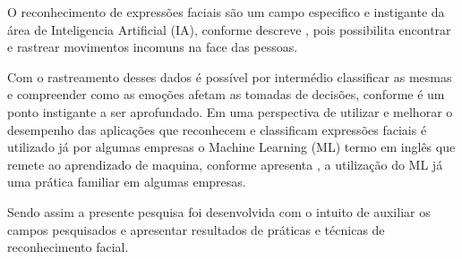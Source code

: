 O reconhecimento de expressões faciais são um campo especifico e instigante da área de Inteligencia Artificial (IA), conforme descreve \cite{murtaza:2019}, pois possibilita encontrar e rastrear movimentos incomuns na face das pessoas.

Com o rastreamento desses dados é possível por intermédio classificar as mesmas e compreender como as emoções afetam as tomadas de decisões, conforme \cite{hieida:2018} é um ponto instigante a ser aprofundado.
Em uma perspectiva de utilizar e melhorar o desempenho das aplicações que reconhecem e classificam expressões faciais é utilizado já por algumas empresas o Machine Learning (ML) termo em inglês que remete ao aprendizado de maquina, conforme apresenta \cite{ray:2019}, a utilização do ML já uma prática familiar em algumas empresas.

Sendo assim a presente pesquisa foi desenvolvida com o intuito de auxiliar os campos pesquisados e apresentar resultados de práticas e técnicas de reconhecimento facial.